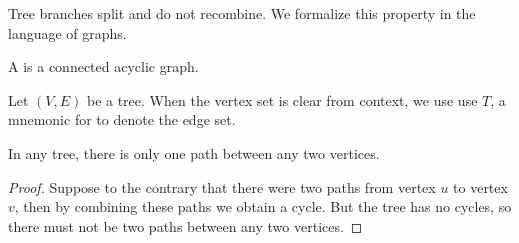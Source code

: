 

Tree branches split
and do not recombine.
We formalize this
property in the
language of graphs.


A
is a
connected
acyclic graph.


Let $(V, E)$ be a tree.
When the vertex set is clear
from context, we use
use $T$, a mnemonic for 
to denote the edge set.


\begin{prop}
  In any tree,
  there is only one
  path between
  any two vertices.

\begin{proof}
  Suppose to the contrary that
  there were two paths from
  vertex $u$ to vertex $v$,
  then by combining these paths
  we obtain a cycle. But the
  tree has no cycles,
  so there must not be two paths
  between any two vertices.
\end{proof}
\end{prop}
